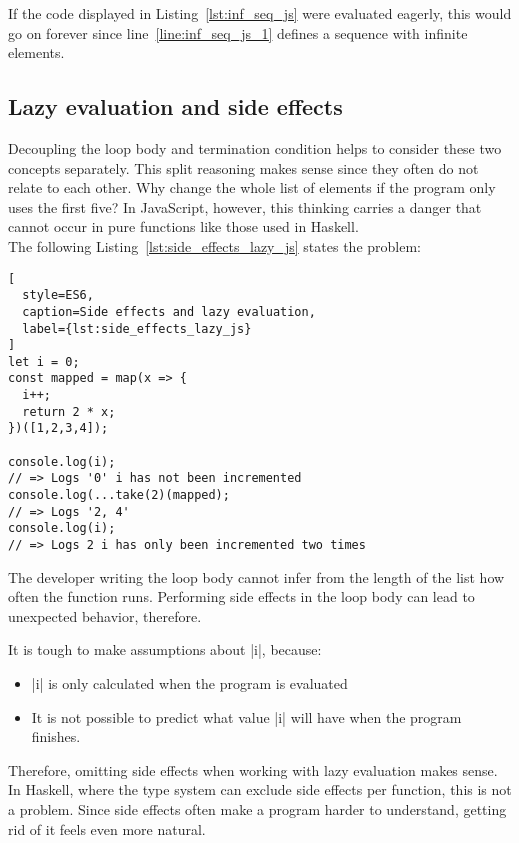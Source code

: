 If the code displayed in Listing~\ref{lst:inf_seq_js} were evaluated eagerly,
this would go on forever since line~\ref{line:inf_seq_js_1} defines a sequence
with infinite elements. \\ 

\subsection{Lazy evaluation and side effects} %
\label{sub:Lazy evaluation and side effects}
Decoupling the loop body and termination condition helps to consider these two
concepts separately. This split reasoning makes sense since they often do not
relate to each other. Why change the whole list of elements if the program only
uses the first five? In JavaScript, however, this thinking carries a danger
that cannot occur in pure functions like those used in Haskell. \\ 
The following Listing~\ref{lst:side_effects_lazy_js} states the problem:

\begin{lstlisting}[
  style=ES6,
  caption=Side effects and lazy evaluation,
  label={lst:side_effects_lazy_js}
]
let i = 0;
const mapped = map(x => {
  i++;
  return 2 * x;
})([1,2,3,4]);

console.log(i);
// => Logs '0' i has not been incremented
console.log(...take(2)(mapped);
// => Logs '2, 4' 
console.log(i);
// => Logs 2 i has only been incremented two times
\end{lstlisting}

The developer writing the loop body cannot infer from the length of the list
how often the function runs. Performing side effects in the loop body can lead
to unexpected behavior, therefore. 

It is tough to make assumptions about |i|, because:
\begin{itemize}
  \item |i| is only calculated when the program is evaluated
  \item It is not possible to predict what value |i| will have when the program
    finishes.
\end{itemize}

Therefore, omitting side effects when working with lazy evaluation makes sense.
In Haskell, where the type system can exclude side effects per function, this
is not a problem. Since side effects often make a program harder to understand,
getting rid of it feels even more natural.

